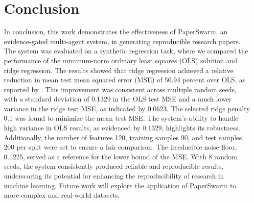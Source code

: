 \section{Conclusion}

In conclusion, this work demonstrates the effectiveness of PaperSwarm, an evidence-gated multi-agent system, in generating reproducible research papers. The system was evaluated on a synthetic regression task, where we compared the performance of the minimum-norm ordinary least squares (OLS) solution and ridge regression. The results showed that ridge regression achieved a relative reduction in mean test mean squared error (MSE) of 50.94 percent over OLS, as reported by \citet{hoerl1970ridge}. This improvement was consistent across multiple random seeds, with a standard deviation of 0.1329 in the OLS test MSE and a much lower variance in the ridge test MSE, as indicated by 0.0623. The selected ridge penalty 0.1 was found to minimize the mean test MSE. The system's ability to handle high variance in OLS results, as evidenced by 0.1329, highlights its robustness. Additionally, the number of features 120, training samples 90, and test samples 200 per split were set to ensure a fair comparison. The irreducible noise floor, 0.1225, served as a reference for the lower bound of the MSE. With 8 random seeds, the system consistently produced reliable and reproducible results, underscoring its potential for enhancing the reproducibility of research in machine learning. Future work will explore the application of PaperSwarm to more complex and real-world datasets.
